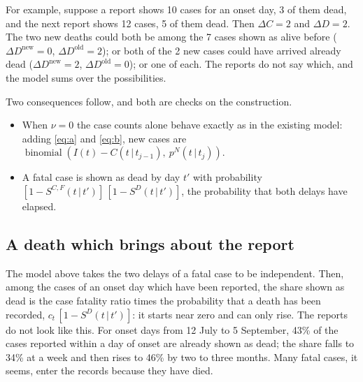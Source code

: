 \documentclass[11pt,a4paper]{article}
\newcommand{\given}{\,|\,}
\newcommand{\bin}{\operatorname{binomial}}
\newcommand{\dnew}{\Delta D^{\mathrm{new}}}
\newcommand{\dold}{\Delta D^{\mathrm{old}}}
\begin{document}
For example, suppose a report shows 10 cases for an onset day, 3 of them
dead, and the next report shows 12 cases, 5 of them dead. Then
$\Delta C=2$ and $\Delta D=2$. The two new deaths could both be among the 7
cases shown as alive before ($\dnew=0$, $\dold=2$); or both of the 2 new
cases could have arrived already dead ($\dnew=2$, $\dold=0$); or one of each.
The reports do not say which, and the model sums over the possibilities.

Two consequences follow, and both are checks on the construction.
\begin{itemize}
\item When $\nu=0$ the case counts alone behave exactly as in the existing
model: adding \eqref{eq:a} and \eqref{eq:b}, new cases are
$\bin(I(t)-C(t\given t_{j-1}),\ p^{N}(t\given t_j))$.
\item A fatal case is shown as dead by day $t'$ with probability
$[1-S^{C,F}(t\given t')]\,[1-S^{D}(t\given t')]$, the
probability that both delays have elapsed.
\end{itemize}

\subsection{A death which brings about the report}\label{sec:triggered}

The model above takes the two delays of a fatal case to be independent.
Then, among the cases of an onset day which have been reported, the share
shown as dead is the case fatality ratio times the probability that a death
has been recorded, $c_t\,[1-S^{D}(t\given t')]$: it starts near zero and
can only rise. The reports do not look like this. For onset days from 12
July to 5 September, 43\% of the cases reported within a day of onset are
already shown as dead; the share falls to 34\% at a week and then rises to
46\% by two to three months. Many fatal cases, it seems, enter the records
because they have died.
\end{document}
